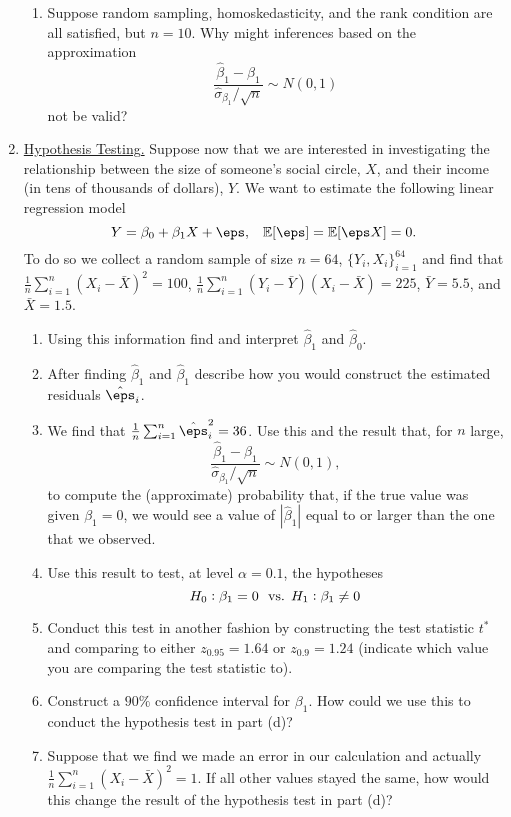 \documentclass[10pt]{article}
\begin{document}
\begin{enumerate}
\begin{enumerate}
		\item Suppose random sampling, homoskedasticity, and the rank condition are all satisfied, but \(n = 10\). Why might inferences based on the approximation 
		\[
			\frac{\hat\beta_1 - \beta_1}{\hat\sigma_{\beta_1}/\sqrt{n}} \sim N(0,1) 
		\]
		not be valid?
	\end{enumerate}
	\item \underline{Hypothesis Testing.} Suppose now that we are interested in investigating the relationship between the size of someone's social circle, \(X\), and their income (in tens of thousands of dollars), \(Y\). We want to estimate the following linear regression model
	\[
		Y = \beta_0 + \beta_1X + \eps,\;\;\; \E[\eps] = \E[\eps X] = 0
	.\] 
	To do so we collect a random sample of size \(n = 64\),  \(\{Y_i,X_i\}_{i=1}^{64}\) and find that \(\frac{1}{n}\sum_{i=1}^n (X_i - \bar X)^2 = 100\), \(\frac{1}{n}\sum_{i=1}^n (Y_i - \bar Y)(X_i - \bar X) = 225\), \(\bar Y = 5.5\), and  \(\bar X = 1.5\).
	\begin{enumerate}
		\item Using this information find and interpret \(\hat\beta_1\) and \(\hat\beta_0\).
		\item After finding \(\hat\beta_1\) and  \(\hat\beta_1\) describe how you would construct the estimated residuals  \(\hat\eps_i\).
		\item We find that \(\frac{1}{n}\sum_{i=1}^n \hat\eps_i^2 = 36\). Use this and the result that, for \(n\) large, 
		\[
			\frac{\hat\beta_1 - \beta_1}{\hat\sigma_{\beta_1}/\sqrt{n}}\sim N(0,1) 
		,\]
		to compute the (approximate) probability that, if the true value was given \(\beta_1 = 0\), we would see a value of \(|\hat\beta_1|\) equal to or larger than the one that we observed.
		\item Use this result to test, at level \(\alpha = 0.1\), the hypotheses
		\[
			H_0: \beta_1 = 0\hbox{ }\text{ vs. }H_1:\beta_1 \neq 0
		\]
		\item Conduct this test in another fashion by constructing the test statistic \(t^*\) and comparing to either  \(z_{0.95} = 1.64\) or  \(z_{0.9} = 1.24\) (indicate which value you are comparing the test statistic to).
		\item Construct a \(90\%\) confidence interval for  \(\beta_1\). How could we use this to conduct the hypothesis test in part (d)?
		\item Suppose that we find we made an error in our calculation and actually \(\frac{1}{n}\sum_{i=1}^n (X_i - \bar X)^2 = 1\). If all other values stayed the same, how would this change the result of the hypothesis test in part (d)?

\end{enumerate}
\end{enumerate}
\end{document}
